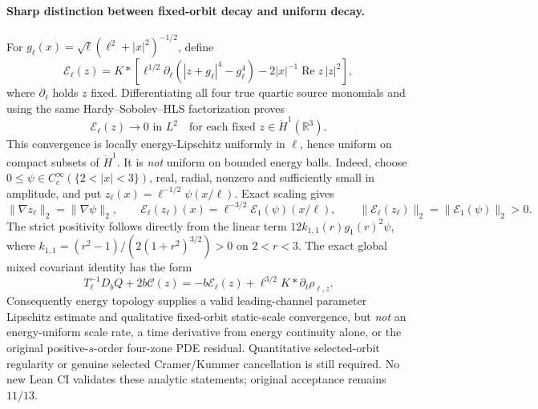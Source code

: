 \paragraph{Sharp distinction between fixed-orbit decay and uniform decay.}
For \(g_\ell(x)=\sqrt\ell(\ell^2+|x|^2)^{-1/2}\), define
\[
 \mathcal E_\ell(z)
 =K*\left[\ell^{1/2}\partial_\ell
 (|z+g_\ell|^4-g_\ell^4)
 -2|x|^{-1}\operatorname{Re}z\,|z|^2\right],
\]
where \(\partial_\ell\) holds \(z\) fixed. Differentiating
all four true quartic source monomials and using the same
Hardy--Sobolev--HLS factorization proves
\[
 \mathcal E_\ell(z)\to0\text{ in }L^2\quad
 \text{for each fixed }z\in\dot H^1(\mathbb R^3).
 \tag{HBL-E-POINT}
\]
This convergence is locally energy-Lipschitz uniformly in \(\ell\),
hence uniform on compact subsets of \(\dot H^1\). It is
\emph{not} uniform on bounded energy balls. Indeed, choose
\(0\le\psi\in C_c^\infty(\{2<|x|<3\})\), real, radial,
nonzero and sufficiently small in amplitude, and put
\(z_\ell(x)=\ell^{-1/2}\psi(x/\ell)\). Exact scaling gives
\[
 \|\nabla z_\ell\|_2=\|\nabla\psi\|_2,\qquad
 \mathcal E_\ell(z_\ell)(x)
 =\ell^{-3/2}\mathcal E_1(\psi)(x/\ell),\qquad
 \|\mathcal E_\ell(z_\ell)\|_2
 =\|\mathcal E_1(\psi)\|_2>0.
 \tag{HBL-E-NOUNI}
\]
The strict positivity follows directly from the linear term
\(12 k_{1,1}(r)g_1(r)^2\psi\), where
\(k_{1,1}=(r^2-1)/(2(1+r^2)^{3/2})>0\) on \(2<r<3\).
The exact global mixed covariant identity has the form
\[
 T_\ell^{-1}D_bQ+2b\mathcal C(z)
 =-b\mathcal E_\ell(z)
 +\ell^{3/2}K*\partial_t\rho_{\ell,z}.
\]
Consequently energy topology supplies a valid leading-channel
parameter Lipschitz estimate and qualitative fixed-orbit
static-scale convergence, but \emph{not} an energy-uniform scale
rate, a time derivative from energy continuity alone, or the
original positive-\(s\)-order four-zone PDE residual.
Quantitative selected-orbit regularity or genuine selected
Cramer/Kummer cancellation is still required. No new Lean
CI validates these analytic statements; original acceptance
remains \(11/13\).
